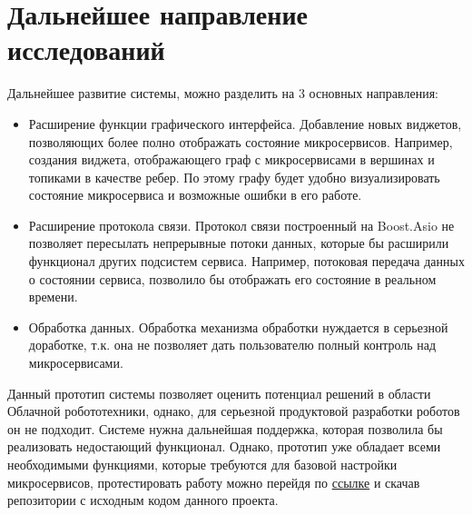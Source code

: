 \documentclass[a4paper, 14pt]{extreport}
\begin{document}
\section{Дальнейшее направление исследований}
\par Дальнейшее развитие системы, можно разделить на 3 основных направления:
\begin{itemize}
        \item Расширение функции графического интерфейса. Добавление новых виджетов, позволяющих более полно отображать 
        состояние микросервисов. Например, создания виджета, отображающего граф с микросервисами в вершинах и 
        топиками в качестве ребер. По этому графу будет удобно визуализировать состояние микросервиса и возможные 
        ошибки в его работе.
        \item Расширение протокола связи. Протокол связи построенный на Boost.Asio не позволяет пересылать непрерывные 
        потоки данных, которые бы расширили функционал других подсистем сервиса. Например, потоковая передача данных 
        о состоянии сервиса, позволило бы отображать его состояние в реальном времени. 
        \item Обработка данных. Обработка механизма обработки нуждается в серьезной доработке, т.к. она не позволяет 
        дать пользователю полный контроль над микросервисами.        
\end{itemize}
\par Данный прототип системы позволяет оценить потенциал решений в области Облачной робототехники, однако, для серьезной продуктовой разработки 
роботов он не подходит. Системе нужна дальнейшая поддержка, которая позволила бы реализовать недостающий функционал.
Однако, прототип уже обладает всеми необходимыми функциями, которые требуются для базовой настройки микросервисов,
протестировать работу можно перейдя по \href{https://github.com/sees1/masters}{ссылке} и скачав репозитории с исходным 
кодом данного проекта.
\end{document}
